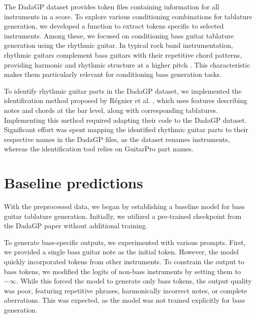 
The DadaGP dataset provides token files containing information for all instruments in a score.
To explore various conditioning combinations for tablature generation, we developed a function to extract tokens specific to selected instruments.
Among these, we focused on conditioning bass guitar tablature generation using the rhythmic guitar.
In typical rock band instrumentation, rhythmic guitars complement bass guitars with their repetitive chord patterns, providing harmonic and rhythmic structure at a higher pitch \cite{regnier_identification_2021}.
This characteristic makes them particularly relevant for conditioning bass generation tasks.

To identify rhythmic guitar parts in the DadaGP dataset, we implemented the identification method proposed by Régnier et al. \cite{regnier_identification_2021}, which uses features describing notes and chords at the bar level, along with corresponding tablatures.
Implementing this method required adapting their code to the DadaGP dataset.
Significant effort was spent mapping the identified rhythmic guitar parts to their respective names in the DadaGP files, as the dataset renames instruments, whereas the identification tool relies on GuitarPro part names.


\section{Baseline predictions}

With the preprocessed data, we began by establishing a baseline model for bass guitar tablature generation.
Initially, we utilized a pre-trained checkpoint from the DadaGP paper \cite{sarmento_dadagp_2021} without additional training.


To generate bass-specific outputs, we experimented with various prompts.
First, we provided a single bass guitar note as the initial token.
However, the model quickly incorporated tokens from other instruments.
To constrain the output to bass tokens, we modified the logits of non-bass instruments by setting them to $-\infty$.
While this forced the model to generate only bass tokens, the output quality was poor, featuring repetitive phrases, harmonically incorrect notes, or complete aberrations.
This was expected, as the model was not trained explicitly for bass generation.

